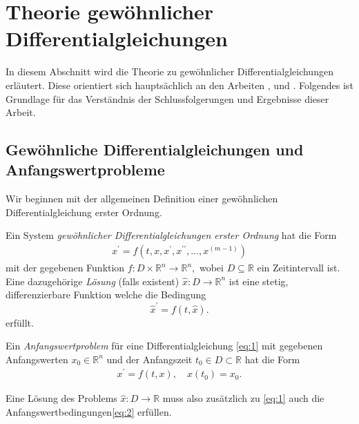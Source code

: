 \section{Theorie gewöhnlicher Differentialgleichungen}
\label{sec:theorie}
In diesem Abschnitt wird die Theorie zu gewöhnlicher Differentialgleichungen erläutert. Diese orientiert sich
hauptsächlich an den Arbeiten \cite{peterdeuflhardfolkmarbornemannNumerischeMathematikGewohnliche},
\cite{ernsthairergerhardwannerSolvingOrdinaryDifferential} und \cite{berndaulbachGewohnlicheDifferentialgleichungen2004}.
Folgendes ist Grundlage für das Verständnis der Schlussfolgerungen und Ergebnisse dieser Arbeit.

\subsection{Gewöhnliche Differentialgleichungen und Anfangswertprobleme}
Wir beginnen mit der allgemeinen Definition einer gewöhnlichen Differentialgleichung erster Ordnung.
\begin{definition}
    Ein System {\em gewöhnlicher Differentialgleichungen erster Ordnung} hat die Form
    \begin{align}
        x^{\prime} = f(t, x, x^{\prime}, x^{\prime\prime}, \dots, x^{(m-1)}) \label{eq:1}
    \end{align}
    mit der gegebenen Funktion
    $
    f : D \times \mathbb{R}^{n} \rightarrow \mathbb{R}^{n},
    $
    wobei $D \subseteq \mathbb{R}$ ein Zeitintervall ist. Eine dazugehörige {\em Lösung} (falls existent)
    $\hat{x} : D \rightarrow \mathbb{R}^n$ ist eine stetig, differenzierbare Funktion welche die Bedingung
    \[
        \hat{x}^{\prime} = f(t, \hat{x}).
    \]
    erfüllt.
\end{definition}
\begin{definition}
    Ein {\em Anfangswertproblem} für eine Differentialgleichung \eqref{eq:1} mit gegebenen Anfangswerten
    $x_{0} \in \mathbb{R}^{n}$ und der Anfangszeit $t_0 \in D \subset \mathbb{R}$ hat die Form
    \begin{align}
        x^{\prime} = f(t, x),\quad x(t_{0})=x_{0}. \label{eq:2}
    \end{align}
\end{definition}
Eine Lösung des Problems $\hat{x} : D \rightarrow \mathbb{R}$ muss also zusätzlich zu \eqref{eq:1} auch die
Anfangswertbedingungen\eqref{eq:2} erfüllen.
